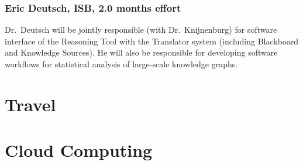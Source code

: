 \documentclass[11pt,notitlepage]{article}
\begin{document}
\subsubsection{Eric Deutsch, ISB, 2.0 months effort}
Dr.~Deutsch will be jointly responsible (with Dr.~Knijnenburg) for software
interface of the Reasoning Tool with the Translator system (including Blackboard
and Knowledge Sources). He will also be responsible for developing software
workflows for statistical analysis of large-scale knowledge graphs.

\section{Travel}

\section{Cloud Computing}
\end{document}
